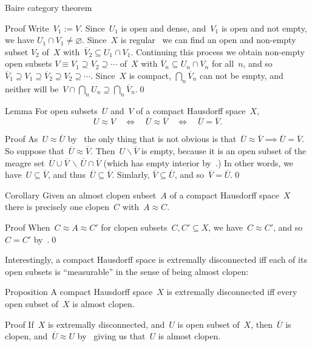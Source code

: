 \documentclass[a]{subfiles}
\begin{document}
\begin{parsec}
\begin{point}{Baire category theorem}
\begin{point}{Proof}
Write~$V_1:=V$.
Since~$U_1$ is open and dense, and~$V_1$ is open and not empty,
we have $U_1\cap V_1\neq \varnothing$.
Since~$X$ is regular~
we can find an open and non-empty subset $V_2$ of~$X$
with~$\overline{V}_2\subseteq U_1\cap V_1$.
Continuing this process
we obtain non-empty open subsets $V\equiv V_1 \supseteq V_2\supseteq \dotsb$
of~$X$ with $\overline{V}_n \subseteq U_n\cap V_n$
for all~$n$,
and so~$
\overline{V}_1 \supseteq V_1 
\supseteq \overline{V}_2 \supseteq V_2 
\supseteq \dotsb$.
Since~$X$ is compact,
$\bigcap_n \overline{V}_n$
can not be empty,
and neither will be~$V\cap \bigcap_n U_n
\supseteq \bigcap_n \overline{V}_n$.\qed
\end{point}
\end{point}
\begin{point}{Lemma}%
For open subsets~$U$ and~$V$ of a compact Hausdorff
space~$X$,
\begin{equation*}
U\approx V\quad\iff\quad
\overline{U}\approx \overline{V}
\quad\iff\quad
\overline{U}=\overline{V}.
\end{equation*}
\begin{point}{Proof}%
As~$U\approx \overline{U}$ by~
the only thing that is not obvious
is that~$\overline{U}\approx \overline{V} \implies \overline{U}=\overline{V}$.
So suppose that~$\overline{U}\approx \overline{V}$.
Then~$U\backslash \overline{V}$
is empty, because it is an open subset of the
meagre set~$\overline{U}\cup\overline{V}\,\backslash\,
\overline{U}\cap\overline{V}$
(which has empty interior by~.) In other words,
we have~$U\subseteq \overline{V}$, 
and thus~$\overline{U}\subseteq \overline{V}$.
Simlarly, $\overline{V}\subseteq\overline{U}$,
and so~$\overline{V}=\overline{U}$.\qed
\end{point}
\end{point}
\begin{point}{Corollary}%
Given an almost clopen subset~$A$ of a compact Hausdorff
space~$X$ there is precisely one clopen~$C$ with~$A\approx C$.
\begin{point}{Proof}%
When~$C\approx A \approx C'$
for clopen subsets~$C,C'\subseteq X$,
we have~$C\approx C'$,
and so~$C=C'$ by~.\qed
\end{point}
\end{point}
\begin{point}%
Interestingly,
a compact Hausdorff space is extremally disconnected
iff each of its open subsets is ``measurable''
in the sense of being almost clopen:
\end{point}
\begin{point}{Proposition}%
A compact Hausdorff space~$X$
is extremally disconnected
iff every open subset of~$X$
is almost clopen.
\begin{point}{Proof}%
If~$X$ is extremally disconnected,
and~$U$ is open subset of~$X$,
then~$\overline{U}$ is clopen,
and~$\overline{U}\approx U$ by~
giving us that~$U$ is almost clopen.


\end{point}
\end{point}
\end{parsec}
\end{document}
